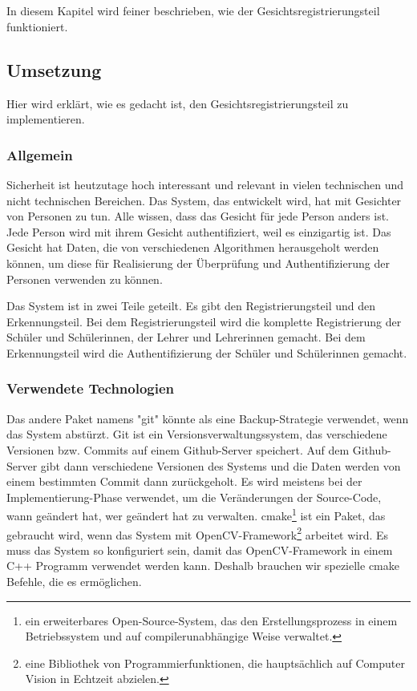 
\chapter{\docname}
In diesem Kapitel wird feiner beschrieben, wie der Gesichtsregistrierungsteil funktioniert.
\label{\docname}
\section{Umsetzung}
Hier wird erkl\"art, wie es gedacht ist, den Gesichtsregistrierungsteil zu implementieren. 
\subsection{Allgemein}
Sicherheit ist heutzutage hoch interessant und relevant in vielen technischen und nicht technischen Bereichen. Das System, das entwickelt wird, hat mit Gesichter von Personen zu tun. Alle wissen, dass das Gesicht f\"ur jede Person anders ist. Jede Person wird mit ihrem Gesicht authentifiziert, weil es einzigartig ist. Das Gesicht hat Daten, die von verschiedenen Algorithmen herausgeholt werden k\"onnen, um diese f\"ur Realisierung der \"Uberpr\"ufung und Authentifizierung der Personen verwenden zu k\"onnen. 

Das System ist in zwei Teile geteilt. Es gibt den Registrierungsteil und den Erkennungsteil. Bei dem Registrierungsteil wird die komplette Registrierung der Sch\"uler und Sch\"ulerinnen, der Lehrer und Lehrerinnen gemacht. Bei dem Erkennungsteil wird die Authentifizierung der Sch\"uler und Sch\"ulerinnen gemacht. 
\subsection{Verwendete Technologien}
Das andere Paket namens "git" k\"onnte als eine Backup-Strategie verwendet, wenn das System abst\"urzt. Git ist ein Versionsverwaltungssystem, das verschiedene Versionen bzw. Commits auf einem Github-Server speichert. Auf dem Github-Server gibt dann verschiedene Versionen des Systems und die Daten werden von einem bestimmten Commit dann zur\"uckgeholt. Es wird meistens bei der Implementierung-Phase verwendet, um die Ver\"anderungen der Source-Code, wann ge\"andert hat, wer ge\"andert hat zu verwalten.
cmake\footnote{ein erweiterbares Open-Source-System, das den Erstellungsprozess in einem Betriebssystem und auf compilerunabhängige Weise verwaltet.} ist ein Paket, das gebraucht wird, wenn das System mit OpenCV-Framework\footnote{eine Bibliothek von Programmierfunktionen, die hauptsächlich auf Computer Vision in Echtzeit abzielen.} arbeitet wird. Es muss das System so konfiguriert sein, damit das OpenCV-Framework in einem C++ Programm verwendet werden kann. Deshalb brauchen wir spezielle cmake Befehle, die es erm\"oglichen.

